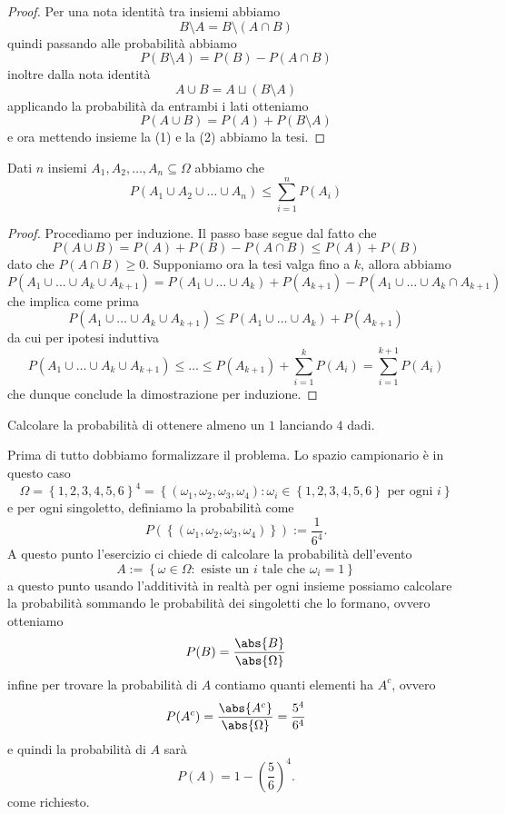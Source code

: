 \documentclass[11pt]{scrartcl}
\begin{document}
	\begin{proof}
		Per una nota identità tra insiemi abbiamo
		$$B\setminus A = B\setminus (A\cap B)$$
		quindi passando alle probabilità abbiamo
		\begin{equation}
			P(B\setminus A)=P(B)-P(A\cap B)
		\end{equation}
		inoltre dalla nota identità
		$$A\cup B = A \sqcup (B\setminus A)$$
		applicando la probabilità da entrambi i lati otteniamo
		\begin{equation}
			P(A\cup B)=P(A)+P(B\setminus A)
		\end{equation}
		e ora mettendo insieme la (1) e la (2) abbiamo la tesi.
	\end{proof}
	\begin{corollary}
		Dati $n$ insiemi $A_1,A_2,\dots,A_n\subseteq \Omega$ abbiamo che 
		$$P(A_1\cup A_2 \cup \dots \cup A_n)\le \sum_{i=1}^{n}P(A_i)$$ 
	\end{corollary}
	\begin{proof}
		Procediamo per induzione. Il passo base segue dal fatto che 
		$$P(A\cup B)=P(A)+P(B)-P(A\cap B)\le P(A)+P(B)$$
		dato che $P(A\cap B)\ge 0$. Supponiamo ora la tesi valga fino a $k$, allora abbiamo
		$$P(A_1\cup \dots \cup A_k \cup A_{k+1})=P(A_1\cup \dots \cup A_k)+P(A_{k+1})-P(A_1\cup \dots \cup A_k \cap A_{k+1})$$
		che implica come prima
		$$P(A_1\cup \dots \cup A_k \cup A_{k+1})\le P(A_1\cup \dots \cup A_k)+P(A_{k+1})$$
		da cui per ipotesi induttiva
		$$P(A_1\cup \dots \cup A_k \cup A_{k+1})\le \dots \le P(A_{k+1})+\sum_{i=1}^k P(A_i)=\sum_{i=1}^{k+1}P(A_i)$$
		che dunque conclude la dimostrazione per induzione.
	\end{proof}
	\begin{exercise}
		Calcolare la probabilità di ottenere almeno un $1$ lanciando $4$ dadi.
		\begin{answer*}
			Prima di tutto dobbiamo formalizzare il problema. Lo spazio campionario è in questo caso
			$$\Omega=\left\{1,2,3,4,5,6\right\}^4=\left\{(\omega_1,\omega_2,\omega_3,\omega_4):\omega_i\in \left\{1,2,3,4,5,6\right\}\text{ per ogni $i$}\right\}$$
			e per ogni singoletto, definiamo la probabilità come
			$$P(\left\{\left(\omega_1,\omega_2,\omega_3,\omega_4\right)\right\}):=\frac{1}{6^4}.$$
			A questo punto l'esercizio ci chiede di calcolare la probabilità dell'evento
			$$A:=\left\{\omega \in \Omega:\text{ esiste un $i$ tale che } \omega_i=1\right\}$$
			a questo punto usando l'additività in realtà per ogni insieme possiamo calcolare la probabilità sommando le probabilità dei singoletti che lo formano, ovvero otteniamo
			$$P(B)=\frac{\abs{B}}{\abs{\Omega}}$$
			infine per trovare la probabilità di $A$ contiamo quanti elementi ha $A^c$, ovvero
			$$P(A^c)=\frac{\abs{A^c}}{\abs{\Omega}}=\frac{5^4}{6^4}$$
			e quindi la probabilità di $A$ sarà
			$$P(A)=1-\left(\frac{5}{6}\right)^4.$$
			come richiesto.
		\end{answer*}
	\end{exercise}
\end{document}
